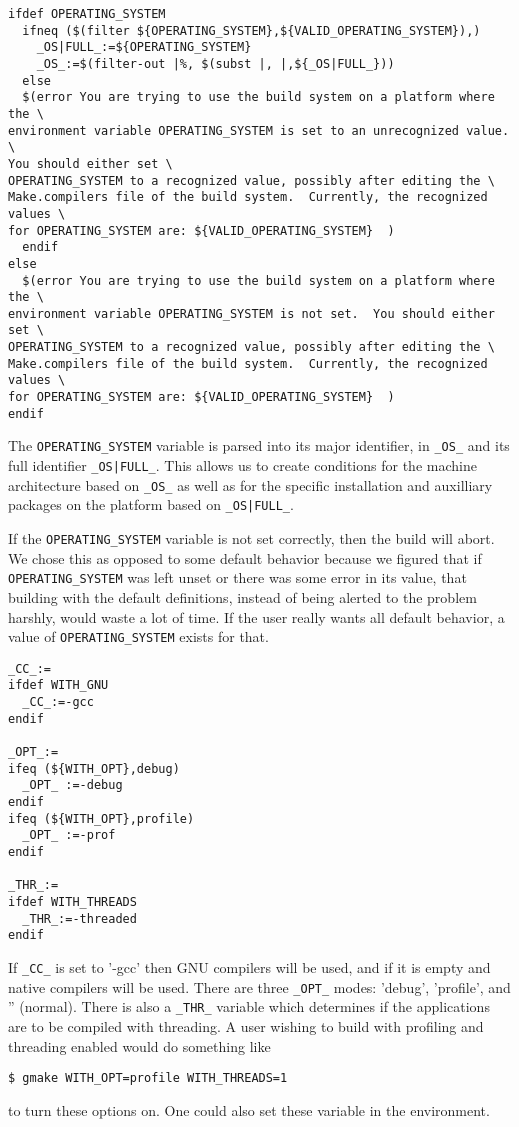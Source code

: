 \documentclass[letterpaper]{article}
\begin{document}
\begin{verbatim}
ifdef OPERATING_SYSTEM
  ifneq ($(filter ${OPERATING_SYSTEM},${VALID_OPERATING_SYSTEM}),)
    _OS|FULL_:=${OPERATING_SYSTEM}
    _OS_:=$(filter-out |%, $(subst |, |,${_OS|FULL_}))
  else
  $(error You are trying to use the build system on a platform where the \
environment variable OPERATING_SYSTEM is set to an unrecognized value.  \
You should either set \
OPERATING_SYSTEM to a recognized value, possibly after editing the \
Make.compilers file of the build system.  Currently, the recognized values \
for OPERATING_SYSTEM are: ${VALID_OPERATING_SYSTEM}  )
  endif
else
  $(error You are trying to use the build system on a platform where the \
environment variable OPERATING_SYSTEM is not set.  You should either set \
OPERATING_SYSTEM to a recognized value, possibly after editing the \
Make.compilers file of the build system.  Currently, the recognized values \
for OPERATING_SYSTEM are: ${VALID_OPERATING_SYSTEM}  )
endif
\end{verbatim}
The \verb+OPERATING_SYSTEM+ variable is parsed into its major identifier,
in \verb+_OS_+ and its full identifier \verb+_OS|FULL_+.  This allows us
to create conditions for the machine architecture based on \verb+_OS_+
as well as for the specific installation and auxilliary packages on the
platform based on \verb+_OS|FULL_+.

If the \verb+OPERATING_SYSTEM+ variable is not set correctly, then the
build will abort.  We chose this as opposed to some default behavior because
we figured that if \verb+OPERATING_SYSTEM+ was left unset or there was
some error in its value, that building with the default definitions, instead
of being alerted to the problem harshly, would waste a lot of time.
If the user really wants all default behavior, a value of
\verb+OPERATING_SYSTEM+ exists for that.

\begin{verbatim}
_CC_:=
ifdef WITH_GNU
  _CC_:=-gcc
endif

_OPT_:=
ifeq (${WITH_OPT},debug)
  _OPT_ :=-debug
endif
ifeq (${WITH_OPT},profile)
  _OPT_ :=-prof
endif

_THR_:=
ifdef WITH_THREADS
  _THR_:=-threaded
endif
\end{verbatim}
If \verb+_CC_+ is set to '-gcc'
then GNU compilers will be used, and if it is empty and native
compilers will be used.
There are three \verb+_OPT_+ modes: 'debug', 'profile',
and '' (normal).  There is also a \verb+_THR_+ variable which determines
if the applications are to be compiled with threading.  A user wishing
to build with profiling and threading enabled would do something like
\begin{verbatim}
$ gmake WITH_OPT=profile WITH_THREADS=1
\end{verbatim}
to turn these options on.  One could also set these variable in the
environment.
\end{document}
